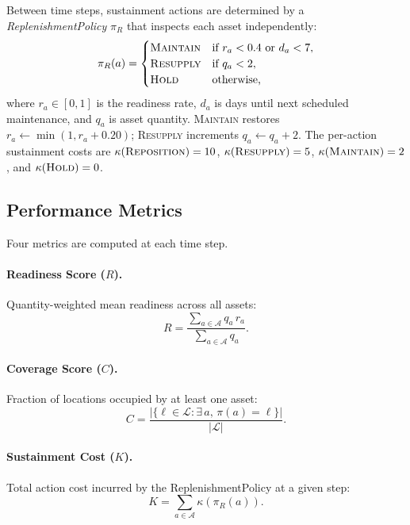 \documentclass[11pt]{article}
\begin{document}
Between time steps, sustainment actions are determined by a
\emph{ReplenishmentPolicy} $\pi_R$ that inspects each asset independently:
\begin{equation}
    \pi_R(a) =
    \begin{cases}
        \textsc{Maintain}  & \text{if } r_a < 0.4 \text{ or } d_a < 7, \\
        \textsc{Resupply}  & \text{if } q_a < 2, \\
        \textsc{Hold}      & \text{otherwise,}
    \end{cases}
    \label{eq:policy}
\end{equation}
where $r_a \in [0,1]$ is the readiness rate, $d_a$ is days until next
scheduled maintenance, and $q_a$ is asset quantity.
\textsc{Maintain} restores $r_a \leftarrow \min(1, r_a + 0.20)$;
\textsc{Resupply} increments $q_a \leftarrow q_a + 2$.
The per-action sustainment costs are
$\kappa(\textsc{Reposition}) = 10$,
$\kappa(\textsc{Resupply}) = 5$,
$\kappa(\textsc{Maintain}) = 2$, and
$\kappa(\textsc{Hold}) = 0$.

\subsection{Performance Metrics}
\label{sec:exp1:metrics}

Four metrics are computed at each time step.

\paragraph{Readiness Score ($R$).}
Quantity-weighted mean readiness across all assets:
\begin{equation}
    R = \frac{\sum_{a \in \mathcal{A}} q_a \, r_a}{\sum_{a \in \mathcal{A}} q_a}.
    \label{eq:readiness}
\end{equation}

\paragraph{Coverage Score ($C$).}
Fraction of locations occupied by at least one asset:
\begin{equation}
    C = \frac{|\{\ell \in \mathcal{L} : \exists\, a,\, \pi(a) = \ell\}|}{|\mathcal{L}|}.
    \label{eq:coverage}
\end{equation}

\paragraph{Sustainment Cost ($K$).}
Total action cost incurred by the ReplenishmentPolicy at a given step:
\begin{equation}
    K = \sum_{a \in \mathcal{A}} \kappa\!\left(\pi_R(a)\right).
    \label{eq:cost}
\end{equation}
\end{document}

